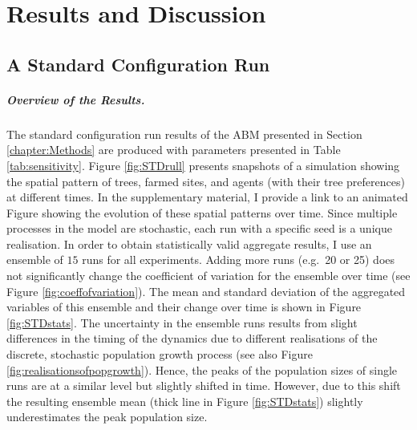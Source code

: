 \chapter{Results and Discussion}\label{chapter:Results}
\FloatBarrier
\section{A Standard Configuration Run}\label{sec:std} 
\paragraph{Overview of the Results.}
The standard configuration run results of the ABM presented in Section \ref{chapter:Methods} are produced with parameters presented in Table \ref{tab:sensitivity}.
Figure \ref{fig:STDrull} presents snapshots of a simulation showing the spatial pattern of trees, farmed sites, and agents (with their tree preferences) at different times.
In the supplementary material, I provide a link to an animated Figure showing the evolution of these spatial patterns over time.
Since multiple processes in the model are stochastic, each run with a specific seed is a unique realisation.
In order to obtain statistically valid aggregate results, I use an ensemble of $15$ runs for all experiments.
Adding more runs (e.g.\ 20 or 25) does not significantly change the coefficient of variation for the ensemble over time (see Figure \ref{fig:coeffofvariation}).
The mean and standard deviation of the aggregated variables of this ensemble and their change over time is shown in Figure \ref{fig:STDstats}.
The uncertainty in the ensemble runs results from slight differences in the timing of the dynamics due to different realisations of the discrete, stochastic population growth process (see also Figure \ref{fig:realisationsofpopgrowth}). 
Hence, the peaks of the population sizes of single runs are at a similar level but slightly shifted in time. 
However, due to this shift the resulting ensemble mean (thick line in Figure \ref{fig:STDstats}) slightly underestimates the peak population size.

